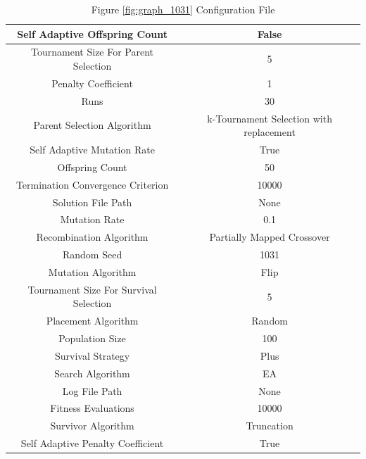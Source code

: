 \documentclass{standalone}
\begin{document}
\clearpage
\begin{table}[!htb]
	\centering
	\caption{Figure \ref{fig:graph_1031} Configuration File}
	\label{tab:graph_1031}
	\begin{tabular}{| c | c |}
		\hline
		Self Adaptive Offspring Count		& False		 \\
		\hline
		Tournament Size For Parent Selection		& 5		 \\
		\hline
		Penalty Coefficient		& 1		 \\
		\hline
		Runs		& 30		 \\
		\hline
		Parent Selection Algorithm		& k-Tournament Selection with replacement		 \\
		\hline
		Self Adaptive Mutation Rate		& True		 \\
		\hline
		Offspring Count		& 50		 \\
		\hline
		Termination Convergence Criterion		& 10000		 \\
		\hline
		Solution File Path		& None		 \\
		\hline
		Mutation Rate		& 0.1		 \\
		\hline
		Recombination Algorithm		& Partially Mapped Crossover		 \\
		\hline
		Random Seed		& 1031		 \\
		\hline
		Mutation Algorithm		& Flip		 \\
		\hline
		Tournament Size For Survival Selection		& 5		 \\
		\hline
		Placement Algorithm		& Random		 \\
		\hline
		Population Size		& 100		 \\
		\hline
		Survival Strategy		& Plus		 \\
		\hline
		Search Algorithm		& EA		 \\
		\hline
		Log File Path		& None		 \\
		\hline
		Fitness Evaluations		& 10000		 \\
		\hline
		Survivor Algorithm		& Truncation		 \\
		\hline
		Self Adaptive Penalty Coefficient		& True		 \\
		\hline
	\end{tabular}
\end{table}
\end{document}
